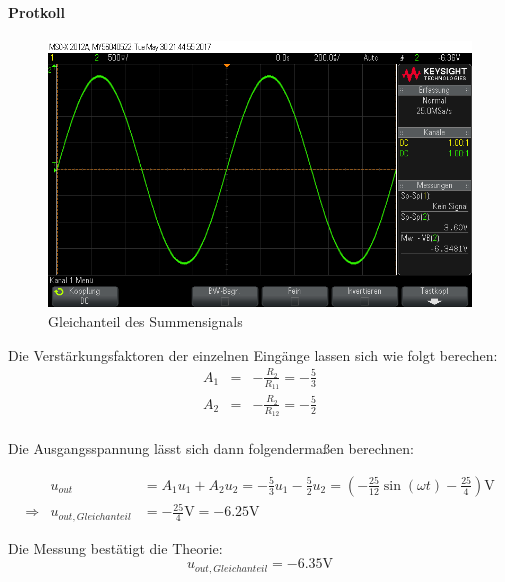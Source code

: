 \documentclass[10pt]{scrreprt}
\begin{document}
    \paragraph{Protkoll}
    \begin{center}
        \begin{figure}[H]
            \includegraphics[width=\textwidth]{scope_6.png}
            \caption{Gleichanteil des Summensignals}
        \end{figure}
    \end{center}

    Die Verstärkungsfaktoren der einzelnen Eingänge lassen sich wie folgt berechen:
    \begin{eqnarray*}
        A_1 &=& -\frac{R_2}{R_{11}} = -\frac{5}{3}\\
        A_2 &=& -\frac{R_2}{R_{12}} = -\frac{5}{2}\\
    \end{eqnarray*}

    Die Ausgangsspannung lässt sich dann folgendermaßen berechnen:

    \begin{eqnarray*}
        &u_{out}& = A_1 u_1 + A_2 u_2 = -\frac{5}{3} u_1 -\frac{5}{2} u_2 =
        (-\frac{25}{12}\sin(\omega t) - \frac{25}{4})\si{\volt}\\
        \Rightarrow &u_{out,Gleichanteil}& = -\frac{25}{4}\si{\volt} = -6.25\si{\volt}
    \end{eqnarray*}

    Die Messung bestätigt die Theorie:
    \begin{equation*}
        u_{out,Gleichanteil} = -6.35\si{\volt}
    \end{equation*}
\end{document}
